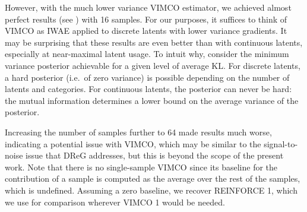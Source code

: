 However, with the much lower variance VIMCO estimator, we achieved almost perfect results (see ) with 16 samples.
For our purposes, it suffices to think of VIMCO as IWAE applied to discrete latents with lower variance gradients.
It may be surprising that these results are even better than with continuous latents, especially at near-maximal latent usage.
To intuit why, consider the minimum variance posterior achievable for a given level of average KL.
For discrete latents, a hard posterior (i.e.\ of zero variance) is possible depending on the number of latents and categories.
For continuous latents, the posterior can never be hard: the mutual information determines a lower bound on the average variance of the posterior.

Increasing the number of samples further to 64 made results much worse, indicating a potential issue with VIMCO, which may be similar to the signal-to-noise issue that DReG addresses, but this is beyond the scope of the present work.
Note that there is no single-sample VIMCO since its baseline for the contribution of a sample is computed as the average over the rest of the samples, which is undefined.
Assuming a zero baseline, we recover REINFORCE 1, which we use for comparison wherever VIMCO 1 would be needed.

